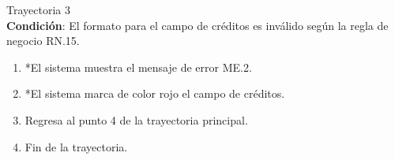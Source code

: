 \large{Trayectoria 3}\\
\textbf{Condición}: El formato para el campo de créditos es inválido según la regla de negocio RN.15.
\begin{enumerate}
    \item *El sistema muestra el mensaje de error ME.2.
    \item *El sistema marca de color rojo el campo de créditos.
    \item Regresa al punto 4 de la trayectoria principal.
    \item Fin de la trayectoria.
\end{enumerate}